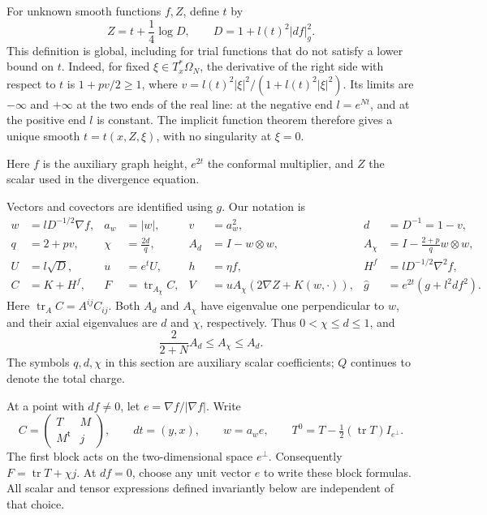 For unknown smooth functions $f,Z$, define $t$ by
\begin{equation}\label{sy:implicit-t}
 Z=t+\frac14\log D,\qquad D=1+l(t)^2|df|_g^2.
\end{equation}
This definition is global, including for trial functions that do not
satisfy a lower bound on $t$.  Indeed, for fixed $\xi\in T_x^*\Omega_N$,
the derivative of the right side with respect to $t$ is
$1+pv/2\ge1$, where
$v=l(t)^2|\xi|^2/(1+l(t)^2|\xi|^2)$.
Its limits are $-\infty$ and $+\infty$ at the two ends of the real
line: at the negative end $l=e^{Nt}$, and at the positive end $l$ is
constant.  The implicit function theorem therefore gives a unique
smooth $t=t(x,Z,\xi)$, with no singularity at $\xi=0$.

Here $f$ is the auxiliary graph height, $e^{2t}$ the conformal multiplier,
and $Z$ the scalar used in the divergence equation.

Vectors and covectors are identified using $g$.  Our notation is
\begin{equation}\label{sy:variables}
\begin{aligned}
 w&=lD^{-1/2}\nabla f,& a_w&=|w|,& v&=a_w^2,& d&=D^{-1}=1-v,\\
 q&=2+pv,& \chi&=\frac{2d}{q},&
 A_d&=I-w\otimes w,&
 A_\chi&=I-\frac{2+p}{q}w\otimes w,\\
 U&=l\sqrt D,& u&=e^tU,& h&=\eta f,&
 H^f&=lD^{-1/2}\nabla^2 f,\\
 C&=K+H^f,& F&=\operatorname{tr}_{A_\chi}C,&
 V&=u A_\chi(2\nabla Z+K(w,\cdot)),&
 \widehat g&=e^{2t}(g+l^2df^2).
\end{aligned}
\end{equation}
Here $\operatorname{tr}_A C=A^{ij}C_{ij}$.  Both $A_d$ and
$A_\chi$ have eigenvalue one perpendicular to $w$, and their axial
eigenvalues are $d$ and $\chi$, respectively.  Thus
$0<\chi\le d\le1$, and
\begin{equation}\label{sy:axis-comparison}
 \frac{2}{2+N}A_d\le A_\chi\le A_d.
\end{equation}
The symbols $q,d,\chi$ in this section are auxiliary scalar
coefficients; $Q$ continues to denote the total charge.

At a point with $df\ne0$, let $e=\nabla f/|\nabla f|$.  Write
\begin{equation}\label{sy:blocks}
 C=\begin{pmatrix}T&M\\M^{\mathsf t}&j\end{pmatrix},\qquad
 dt=(y,x),\qquad w=a_we,
 \qquad T^0=T-\tfrac12(\operatorname{tr}T)I_{e^\perp}.
\end{equation}
The first block acts on the two-dimensional space $e^\perp$.
Consequently $F=\operatorname{tr}T+\chi j$.
At $df=0$, choose any unit vector $e$ to write these block formulas.
All scalar and tensor expressions defined invariantly below are
independent of that choice.

